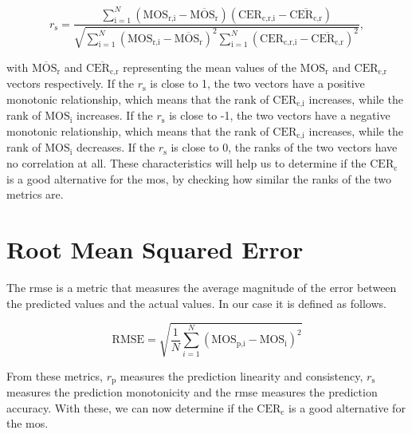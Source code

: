 \begin{equation}
    r_{\text{s}} = \frac{\sum_{\text{i}=1}^{N}{(\text{MOS}_{\text{r,i}}-\overline{\text{MOS}_{\text{r}}})(\text{CER}_{\text{c,r,i}}-\overline{\text{CER}_{\text{c,r}}})}}{\sqrt{\sum_{\text{i}=1}^{N}{(\text{MOS}_{\text{r,i}}-\overline{\text{MOS}_{\text{r}}})^2}\sum_{\text{i}=1}^{N}{(\text{CER}_{\text{c,r,i}}-\overline{\text{CER}_{\text{c,r}}})^2}}},
    \label{eq:spearman}
\end{equation}

with $\overline{\text{MOS}_{\text{r}}}$ and $\overline{\text{CER}_{\text{c,r}}}$ representing the mean values of the $\text{MOS}_{\text{r}}$ and $\text{CER}_{\text{c,r}}$ vectors respectively.
If the $r_{\text{s}}$ is close to 1, the two vectors have a positive monotonic relationship, which means that the rank of $\text{CER}_{\text{c,i}}$ increases, while the rank of $\text{MOS}_{\text{i}}$ increases.
If the $r_{\text{s}}$ is close to -1, the two vectors have a negative monotonic relationship, which means that the rank of $\text{CER}_{\text{c,i}}$ increases, while the rank of $\text{MOS}_{\text{i}}$ decreases.
If the $r_{\text{s}}$ is close to 0, the ranks of the two vectors have no correlation at all.
These characteristics will help us to determine if the $\text{CER}_{\text{c}}$ is a good alternative for the \gls{mos}, by checking how similar the ranks of the two metrics are.


\section{Root Mean Squared Error}
\label{sec:rmse}

The \gls{rmse} is a metric that measures the average magnitude of the error between the predicted values and the actual values.
In our case it is defined as follows.

\begin{equation}
    \text{RMSE} = \sqrt{\frac{1}{N}\sum_{i=1}^{N}{(\text{MOS}_{\text{p,i}} - \text{MOS}_{\text{i}})^2}}
    \label{eq:rmse}
\end{equation}

From these metrics, $r_{\text{p}}$ measures the prediction linearity and consistency, $r_{\text{s}}$ measures the prediction monotonicity and the \gls{rmse} measures the prediction accuracy.
With these, we can now determine if the $\text{CER}_{\text{c}}$ is a good alternative for the \gls{mos}.
